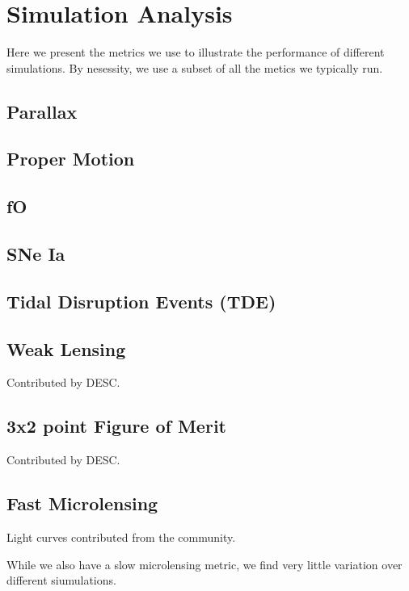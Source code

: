 
\section{Simulation Analysis}

Here we present the metrics we use to illustrate the performance of different simulations. By nesessity, we use a subset of all the metics we typically run.

\subsection{Parallax}


\subsection{Proper Motion}

\subsection{fO}

\subsection{SNe Ia}

\subsection{Tidal Disruption Events (TDE)}

\subsection{Weak Lensing}

Contributed by DESC.

\subsection{3x2 point Figure of Merit}

Contributed by DESC.

\subsection{Fast Microlensing}

Light curves contributed from the community.

While we also have a slow microlensing metric, we find very little variation over different siumulations.

